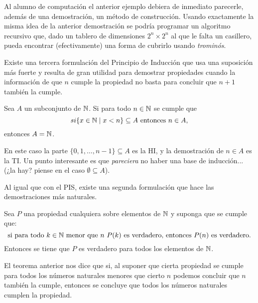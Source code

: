 Al alumno de computación el anterior ejemplo debiera de inmediato parecerle, además de una demostración, un método de construcción.
Usando exactamente la misma idea de la anterior demostración se podría programar un algoritmo recursivo que, dado un tablero de dimensiones $2^n\times 2^n$ al que le falta un casillero, pueda encontrar (efectivamente) una forma de cubrirlo usando \emph{trominós}.

Existe una tercera formulación del Principio de Inducción que usa una suposición más fuerte y resulta de gran utilidad para demostrar propiedades cuando la información de que $n$ cumple la propiedad no basta para concluir que $n+1$ también la cumple.

\begin{teorema}
Sea $A$ un subconjunto de $\mathbb{N}$.
Si para todo $n\in\mathbb{N}$ se cumple que 
\[
si \{x\in \mathbb{N}\mid x<n\} \subseteq A \text{ entonces } n\in A,
\]
entonces $A=\mathbb{N}$.
\end{teorema}
En este caso la parte $\{0,1,\ldots,n-1\}\subseteq A$ es la HI, y la demostración de $n\in A$ es la TI.
Un punto interesante es que \emph{pareciera} no haber una base de inducción... (¿la hay? piense en el caso $\emptyset\subseteq A$).

Al igual que con el PIS, existe una segunda formulación que hace las demostraciones más naturales.

\begin{teorema}
Sea $P$ una propiedad cualquiera sobre elementos de $\mathbb{N}$ y suponga que se cumple que:
\[
\text{si para todo }k\in\mathbb{N}\text{ menor que }n\text{ }P(k)\text{ es verdadero, entonces }P(n)\text{ es verdadero}.
\]
Entonces se tiene que $P$ es verdadero para todos los elementos de $\mathbb{N}$.
\end{teorema}

El teorema anterior nos dice que si, al suponer que cierta propiedad se cumple para todos los números naturales menores que cierto $n$ podemos concluir que $n$ también la cumple, entonces se concluye que todos los números naturales cumplen la propiedad.

